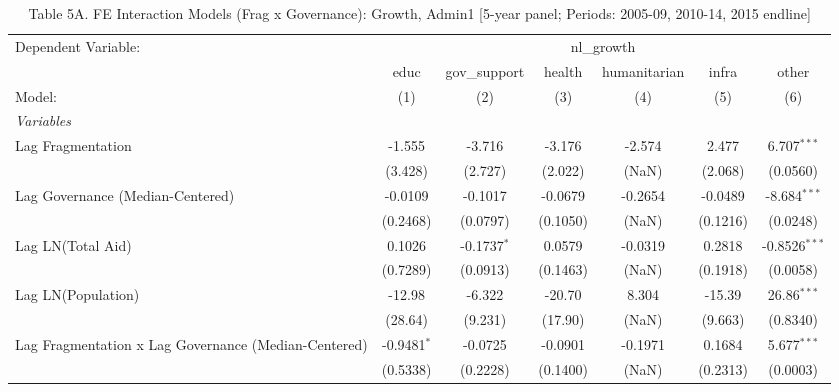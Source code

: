 \begin{table}[H]
   \caption{Table 5A. FE Interaction Models (Frag x Governance): Growth, Admin1 [5-year panel; Periods: 2005-09, 2010-14, 2015 endline]}
   \centering
   \begin{tabular}{lcccccc}
      \tabularnewline \midrule \midrule
      Dependent Variable: & \multicolumn{6}{c}{nl\_growth}\\
                                                           & educ          & gov\_support  & health   & humanitarian & infra    & other \\   
      Model:                                               & (1)           & (2)           & (3)      & (4)          & (5)      & (6)\\  
      \midrule
      \emph{Variables}\\
      Lag Fragmentation                                    & -1.555        & -3.716        & -3.176   & -2.574       & 2.477    & 6.707$^{***}$\\   
                                                           & (3.428)       & (2.727)       & (2.022)  & (NaN)        & (2.068)  & (0.0560)\\   
      Lag Governance (Median-Centered)                     & -0.0109       & -0.1017       & -0.0679  & -0.2654      & -0.0489  & -8.684$^{***}$\\   
                                                           & (0.2468)      & (0.0797)      & (0.1050) & (NaN)        & (0.1216) & (0.0248)\\   
      Lag LN(Total Aid)                                    & 0.1026        & -0.1737$^{*}$ & 0.0579   & -0.0319      & 0.2818   & -0.8526$^{***}$\\   
                                                           & (0.7289)      & (0.0913)      & (0.1463) & (NaN)        & (0.1918) & (0.0058)\\   
      Lag LN(Population)                                   & -12.98        & -6.322        & -20.70   & 8.304        & -15.39   & 26.86$^{***}$\\   
                                                           & (28.64)       & (9.231)       & (17.90)  & (NaN)        & (9.663)  & (0.8340)\\   
      Lag Fragmentation x Lag Governance (Median-Centered) & -0.9481$^{*}$ & -0.0725       & -0.0901  & -0.1971      & 0.1684   & 5.677$^{***}$\\   
                                                           & (0.5338)      & (0.2228)      & (0.1400) & (NaN)        & (0.2313) & (0.0003)\\   

\end{tabular}
\end{table}
